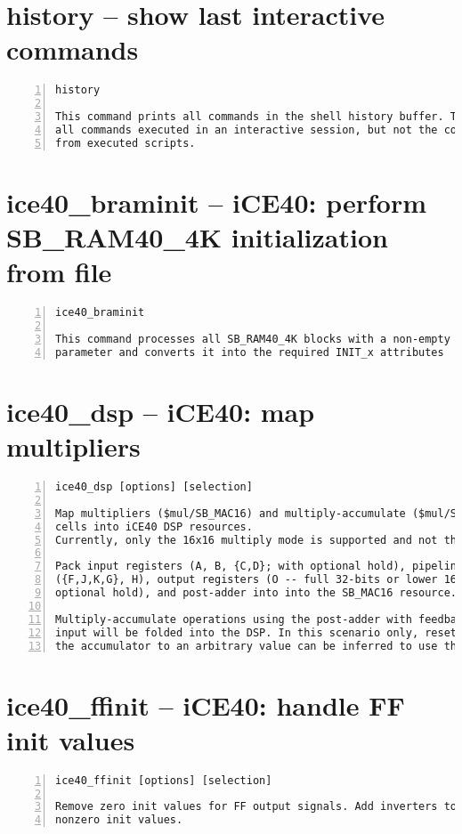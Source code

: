 \section{history -- show last interactive commands}
\label{cmd:history}
\begin{lstlisting}[numbers=left,frame=single]
    history

This command prints all commands in the shell history buffer. This are
all commands executed in an interactive session, but not the commands
from executed scripts.
\end{lstlisting}

\section{ice40\_braminit -- iCE40: perform SB\_RAM40\_4K initialization from file}
\label{cmd:ice40_braminit}
\begin{lstlisting}[numbers=left,frame=single]
    ice40_braminit

This command processes all SB_RAM40_4K blocks with a non-empty INIT_FILE
parameter and converts it into the required INIT_x attributes
\end{lstlisting}

\section{ice40\_dsp -- iCE40: map multipliers}
\label{cmd:ice40_dsp}
\begin{lstlisting}[numbers=left,frame=single]
    ice40_dsp [options] [selection]

Map multipliers ($mul/SB_MAC16) and multiply-accumulate ($mul/SB_MAC16 + $add)
cells into iCE40 DSP resources.
Currently, only the 16x16 multiply mode is supported and not the 2 x 8x8 mode.

Pack input registers (A, B, {C,D}; with optional hold), pipeline registers
({F,J,K,G}, H), output registers (O -- full 32-bits or lower 16-bits only; with
optional hold), and post-adder into into the SB_MAC16 resource.

Multiply-accumulate operations using the post-adder with feedback on the {C,D}
input will be folded into the DSP. In this scenario only, resetting the
the accumulator to an arbitrary value can be inferred to use the {C,D} input.
\end{lstlisting}

\section{ice40\_ffinit -- iCE40: handle FF init values}
\label{cmd:ice40_ffinit}
\begin{lstlisting}[numbers=left,frame=single]
    ice40_ffinit [options] [selection]

Remove zero init values for FF output signals. Add inverters to implement
nonzero init values.
\end{lstlisting}

